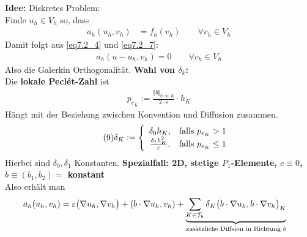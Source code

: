 \textbf{Idee:} Diskretes Problem:\\
Finde $u_h\in V_h$ so, dass
\begin{align}\label{eq7.2_7}\tag{7}
	a_h(u_h,v_h)&=f_h(v_h)\qquad\forall v_h\in V_h
\end{align}
Damit folgt aus \eqref{eq7.2_4} und \eqref{eq7.2_7}:
\begin{align}\label{eq7.2_8}\tag{8}
	a_h(u-u_h,v_h)=0\qquad\forall v_h\in V_h
\end{align}
Also die Galerkin Orthogonalität.\nl
\textbf{Wahl von $\delta_k$:}\\
Die \textbf{lokale Peclét-Zahl} ist
\begin{align*}
	p_{e_K}:=\frac{\Vert b\Vert_{0,\infty,K}}{2\cdot\varepsilon}\cdot h_K
\end{align*}
Hängt mit der Beziehung zwischen Konvention und Diffusion zusammen.
\begin{align}\label{eq7.2_9}\tag{9}
	\delta_K:=\left\lbrace\begin{array}{cl}
		\delta_0 h_K, &\text{falls } p_{e_K}>1\\
		\frac{\delta_1 h_K^2}{\varepsilon}, &\text{falls } p_{e_K}\leq 1	
	\end{array}\right.
\end{align}
Hierbei sind $\delta_0,\delta_1$ Konstanten.\nl
\textbf{Spezialfall: 2D, stetige $P_1$-Elemente, $c\equiv0$, $b\equiv(b_1,b_2)=$ konstant}\\
Also erhält man
\begin{align*}
	a_h(u_h,v_h)&=\varepsilon\big(\nabla u_h,\nabla v_h\big)+(b\cdot\nabla u_h,v_h)
	+\underbrace{\sum\limits_{K\in\mathcal{T}_h}\delta_K\big(b\cdot\nabla u_h,b\cdot\nabla v_h\big)_K}_{\text{zusätzliche Diffsion in Richtung }b}
\end{align*}

